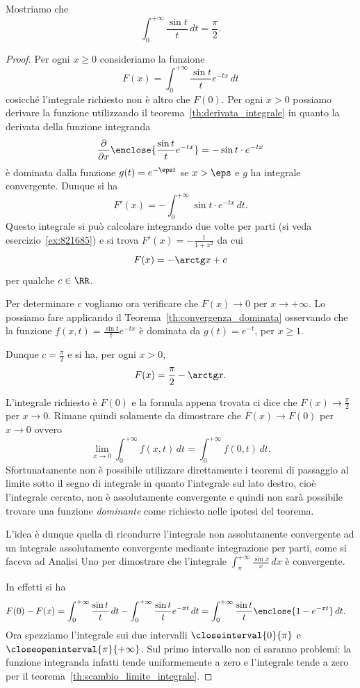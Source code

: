 \begin{exercise}
  \label{ex:integrale_sin_integrale}%
Mostriamo che 
  \[
    \int_0^{+\infty} \frac{\sin t}{t}\, dt = \frac \pi 2.
  \] 
\end{exercise}
\begin{proof}
Per ogni $x \ge 0$ consideriamo la funzione 
\[
  F(x) = \int_0^{+\infty} \frac{\sin t}{t}e^{-tx}\, dt
\]
cosicché l'integrale richiesto non è altro che $F(0)$.
Per ogni $x>0$
possiamo derivare la funzione utilizzando il teorema~\ref{th:derivata_integrale}
in quanto la derivata della funzione integranda 
\[
  \frac{\partial}{\partial x}\enclose{\frac{\sin t}{t}e^{-tx}} 
  = -\sin t \cdot e^{-tx}
\]
è dominata dalla funzione $g(t) = e^{- \eps t}$ se $x>\eps$ e 
$g$ ha integrale convergente.
Dunque si ha 
\[
  F'(x) = - \int_0^{+\infty} \sin t \cdot e^{-tx}\, dt. 
\]
Questo integrale si può calcolare integrando due volte per parti 
(si veda esercizio~\ref{ex:821685}) e si trova 
$F'(x) = -\frac{1}{1+x^2}$ da cui
\[
  F(x) = -\arctg x + c
\]
per qualche $c \in \RR$.

Per determinare $c$ 
vogliamo ora verificare che $F(x) \to 0$ per $x\to +\infty$.
Lo possiamo fare applicando il Teorema~\ref{th:convergenza_dominata} osservando che 
la funzione $f(x,t) = \frac{\sin t}{t}e^{-tx}$ è dominata da $g(t) = e^{-t}$, per $x\ge 1$.

Dunque $c=\frac{\pi} 2$ e si ha, per ogni $x>0$,
\[
  F(x) = \frac{\pi} 2 - \arctg x.
\]

L'integrale richiesto è $F(0)$ e la formula appena trovata ci 
dice che $F(x)\to \frac \pi 2$ per $x\to 0$. 
Rimane quindi solamente da dimostrare che $F(x)\to F(0)$ per 
$x\to 0$ ovvero 
\[
  \lim_{x\to 0} \int_0^{+\infty} f(x,t) \, dt
  = \int_0^{+\infty} f(0,t) \, dt.
\]
Sfortunatamente non è possibile utilizzare direttamente i teoremi 
di passaggio al limite sotto il segno di integrale in quanto 
l'integrale sul lato destro, cioè l'integrale cercato, non 
è assolutamente convergente e quindi non sarà possibile trovare 
una funzione \emph{dominante} come richiesto nelle ipotesi del teorema.

L'idea è dunque quella di ricondurre l'integrale non assolutamente convergente 
ad un integrale assolutamente convergente mediante integrazione per parti, 
come si faceva ad Analisi Uno per dimostrare che l'integrale $\int_\pi^{+\infty} \frac{\sin x}{x}\, dx$ 
è convergente.


In effetti si ha 
\begin{align*}
F(0) - F(x) 
 = \int_0^{+\infty} \frac{\sin t}{t}\, dt  - \int_0^{+\infty} \frac{\sin t}{t}e^{-xt}\, dt
 & = \int_0^{+\infty} \frac{\sin t}{t}\enclose{1-e^{-xt}}\, dt.
\end{align*}
Ora spezziamo l'integrale sui due intervalli $\closeinterval{0}{\pi}$ 
e $\closeopeninterval{\pi}{+\infty}$.
Sul primo intervallo non ci saranno problemi: la funzione integranda 
infatti tende uniformemente a zero e l'integrale tende a zero 
per il teorema~\ref{th:scambio_limite_integrale}.


\end{proof}
